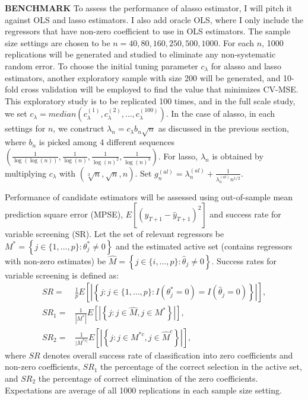 \documentclass[12pt,a4paper]{article}
\begin{document}
\textbf{BENCHMARK} To assess the performance of alasso estimator, I will pitch it against OLS and lasso estimators. I also add oracle OLS, where I only include the regressors that have non-zero coefficient to use in OLS estimators. The sample size settings are chosen to be $ n = 40, 80, 160, 250, 500, 1000 $. For each $ n $, 1000 replications will be generated and studied to eliminate any non-systematic random error. To choose the initial tuning parameter $ c_\lambda $ for alasso and lasso estimators, another exploratory sample with size 200 will be generated, and 10-fold cross validation will be employed to find the value that minimizes CV-MSE. This exploratory study is to be replicated 100 times, and in the full scale study, we set $ c_\lambda = median\left(c^{(1)}_\lambda, c^{(2)}_\lambda, \ldots, c^{(100)}_\lambda\right) $. In the case of alasso, in each settings for $ n $, we construct $ \lambda_n = c_\lambda b_n \sqrt{n} $ as discussed in the previous section, where $ b_n $ is picked among 4 different sequences $ \left(\frac{1}{\log(\log(n))}, \frac{1}{\log(n)}, \frac{1}{\log(n)^2}, \frac{1}{\log(n)^3}\right) $. For lasso, $ \lambda_n $ is obtained by multiplying $ c_\lambda $ with $ \left(\sqrt[3]{n}, \sqrt{n}, n \right) $. Set $ g_n^{(al)} = \lambda_n^{(al)} + \frac{1}{\lambda_n^{(al)} n^{1/2}} $.
	
	Performance of candidate estimators will be assessed using out-of-sample mean prediction square error (MPSE), $ E\left[(y_{T + 1} - \hat{y}_{T + 1})^2\right] $ and success rate for variable screening (SR). Let the set of relevant regressors be $ M^* = \left\lbrace j \in \{1, \ldots, p\}: \theta^*_j \neq 0 \right\rbrace $ and the estimated active set (contains regressors with non-zero estimates) be $ \hat{M} = \left\lbrace j \in \{i, \ldots, p\}:\hat{\theta}_j \neq 0 \right\rbrace $. Success rates for variable screening is defined as:
\begin{align*}
	SR   = & \frac{1}{p}E\left[ \left\lvert \left\lbrace j:j\in \{1, \ldots, p \}: I(\theta^*_j = 0) = I(\hat{\theta}_j = 0) \right\rbrace \right\rvert\right], \\
	SR_1 = & \frac{1}{|M^*|}E\left[ \left\lvert \left\lbrace j:j\in \hat{M}, j \in M^* \right\rbrace \right\rvert\right], \\
	SR_2 = & \frac{1}{|M^{*c|}}E\left[ \left\lvert \left\lbrace j:j\in M^{*c}, j \in \hat{M}^c \right\rbrace \right\rvert\right],
\end{align*}
where $ SR $ denotes overall success rate of classification into zero coefficients and non-zero coefficients, $ SR_1 $ the percentage of the correct selection in the active set, and $ SR_2 $ the percentage of correct elimination of the zero coefficients. Expectations are average of all 1000 replications in each sample size setting.
\end{document}
